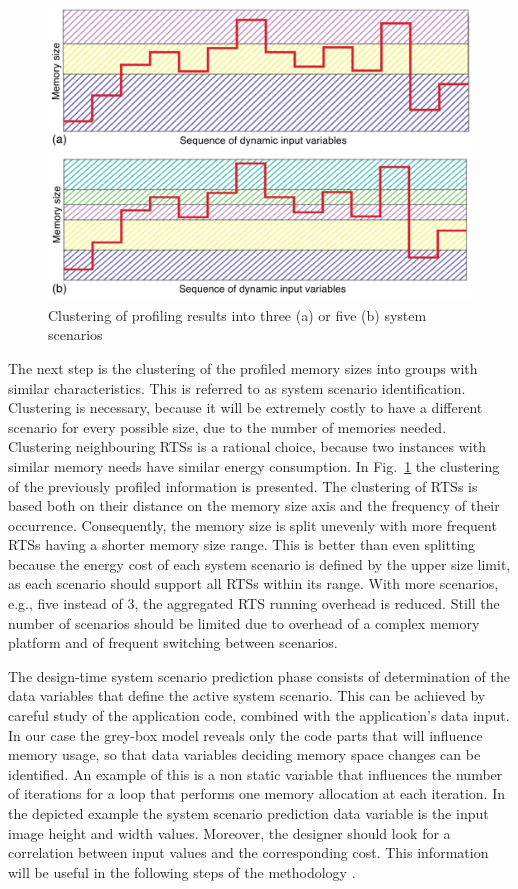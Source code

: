 \begin{figure}[!t]
\centering
\includegraphics[width=\textwidth]{B/Images/1DclusteringShort.pdf}
\caption{Clustering of profiling results into three (a) or five (b) system scenarios}
\label{fig:clustering}
\end{figure}

The next step is the clustering of the profiled memory sizes into groups with similar characteristics. This is referred to as system scenario identification. Clustering is necessary, because it will be extremely costly to have a different scenario for every possible size, due to the number of memories needed. Clustering neighbouring RTSs is a rational choice, because two instances with similar memory needs have similar energy consumption. In Fig.~\ref{fig:clustering} the clustering of the previously profiled information is presented. The clustering of RTSs is based both on their distance on the memory size axis and the frequency of their occurrence. Consequently, the memory size is split unevenly with more frequent RTSs having a shorter memory size range. This is better than even splitting because the energy cost of each system scenario is defined by the upper size limit, as each scenario should support all RTSs within its range. With more scenarios, e.g., five instead of 3, the aggregated RTS running overhead is reduced. Still the number of scenarios should be limited due to overhead of a complex memory platform and of frequent switching between scenarios.

The design-time system scenario prediction phase consists of determination of the data variables that define the active system scenario. This can be achieved by careful study of the application code, combined with the application's data input. In our case the grey-box model reveals only the code parts that will influence memory usage, so that data variables deciding memory space changes can be identified. An example of this is a non static variable that influences the number of iterations for a loop that performs one memory allocation at each iteration. In the depicted example the system scenario prediction data variable is the input image height and width values. Moreover, the designer should look for a correlation between input values and the corresponding cost. This information will be useful in the following steps of the methodology \cite{tcm}.


